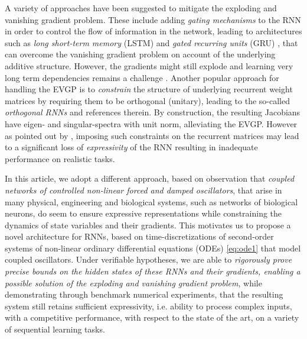 \documentclass{article} \usepackage{iclr2021_conference,times}
\begin{document}
A variety of approaches have been suggested to mitigate the exploding and vanishing gradient problem. These include adding \emph{gating mechanisms} to the RNN in order to control the flow of information in the network, leading to architectures such as \emph{long short-term memory} (LSTM) \citep{lstm} and \emph{gated recurring units} (GRU) \citep{gru}, that can overcome the vanishing gradient problem on account of the underlying additive structure. However, the gradients might still explode and learning very long term dependencies remains a challenge \citep{indrnn}. Another popular approach for handling the EVGP is to \emph{constrain} the structure of underlying recurrent weight matrices by requiring them to be orthogonal (unitary), leading to the so-called \emph{orthogonal RNNs} \citep{orthornn,urnn,eurnn,nnRNN} and references therein. By construction, the resulting Jacobians have eigen- and singular-spectra with unit norm, alleviating the EVGP. However as pointed out by \cite{nnRNN}, imposing such constraints on the recurrent matrices may lead to a significant loss of \emph{expressivity} of the RNN resulting in inadequate performance on realistic tasks.

In this article, we adopt a different approach, based on observation that \emph{coupled networks of controlled non-linear forced and damped oscillators}, that arise in many physical, engineering and biological systems, such as networks of biological neurons, do seem to ensure expressive representations while constraining the dynamics of state variables and their gradients. This motivates us to propose a novel architecture for RNNs, based on time-discretizations of second-order systems of non-linear ordinary differential equations (ODEs) \eqref{eq:ode1} that model coupled oscillators. Under verifiable hypotheses, we are able to \emph{rigorously prove precise bounds on the hidden states of these RNNs and their gradients, enabling a possible solution of the exploding and vanishing gradient problem}, while demonstrating through benchmark numerical experiments, that the resulting system still retains sufficient expressivity, i.e. ability to process complex inputs, with a competitive performance, with respect to the state of the art, on a variety of sequential learning tasks.  
\end{document}
